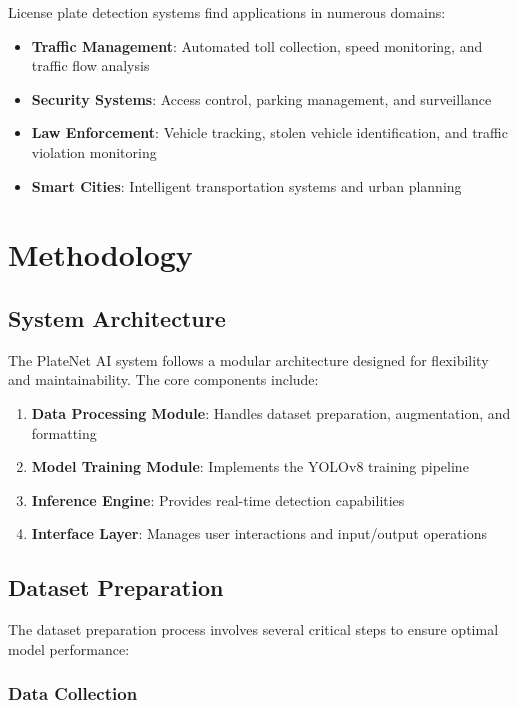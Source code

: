 \documentclass[12pt,a4paper]{article}
\begin{document}
License plate detection systems find applications in numerous domains:

\begin{itemize}
    \item \textbf{Traffic Management}: Automated toll collection, speed monitoring, and traffic flow analysis
    \item \textbf{Security Systems}: Access control, parking management, and surveillance
    \item \textbf{Law Enforcement}: Vehicle tracking, stolen vehicle identification, and traffic violation monitoring
    \item \textbf{Smart Cities}: Intelligent transportation systems and urban planning
\end{itemize}

\section{Methodology}

\subsection{System Architecture}

The PlateNet AI system follows a modular architecture designed for flexibility and maintainability. The core components include:

\begin{enumerate}
    \item \textbf{Data Processing Module}: Handles dataset preparation, augmentation, and formatting
    \item \textbf{Model Training Module}: Implements the YOLOv8 training pipeline
    \item \textbf{Inference Engine}: Provides real-time detection capabilities
    \item \textbf{Interface Layer}: Manages user interactions and input/output operations
\end{enumerate}

\subsection{Dataset Preparation}

The dataset preparation process involves several critical steps to ensure optimal model performance:

\subsubsection{Data Collection}
\end{document}

